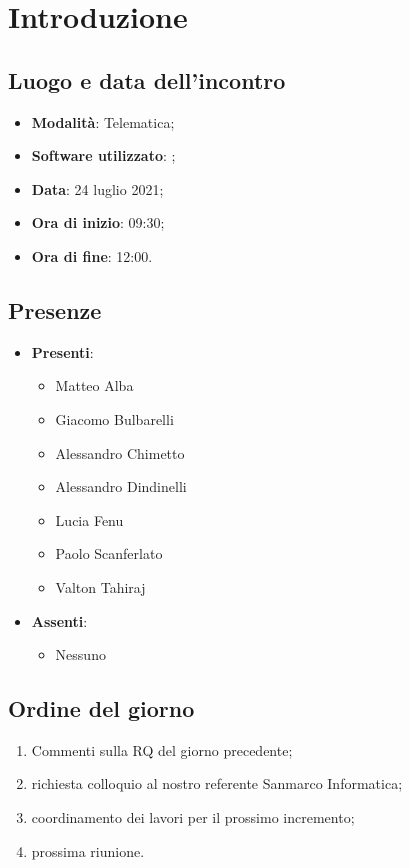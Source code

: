 \documentclass[]{article}
\begin{document}
	

	\newpage


		\section{Introduzione}
		\subsection{Luogo e data dell'incontro}
		\begin{itemize}
			\item \textbf{Modalità}: Telematica;
			\item \textbf{Software utilizzato}: ;
			\item \textbf{Data}: 24 luglio 2021;
			\item \textbf{Ora di inizio}: 09:30;
			\item \textbf{Ora di fine}: 12:00.
		\end{itemize}

		\subsection{Presenze}
		\begin{itemize}
			\item \textbf{Presenti}:
			\begin{itemize}
				\item Matteo Alba
				\item Giacomo Bulbarelli
				\item Alessandro Chimetto
				\item Alessandro Dindinelli
				\item Lucia Fenu
				\item Paolo Scanferlato
				\item Valton Tahiraj
			\end{itemize}
			\item \textbf{Assenti}:
			\begin{itemize}
				\item Nessuno
			\end{itemize}
		\end{itemize}


		\subsection{Ordine del giorno}
		\begin{enumerate}
			\item Commenti sulla RQ del giorno precedente;
			\item richiesta colloquio al nostro referente Sanmarco Informatica;
            \item coordinamento dei lavori per il prossimo incremento;
			\item prossima riunione.
		\end{enumerate}
\end{document}
